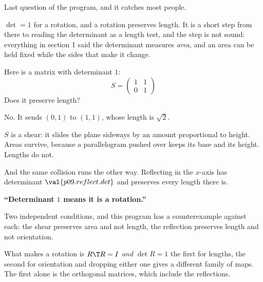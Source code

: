 \begin{fr}
Last question of the program, and it catches most people.

$\det = 1$ for a rotation, and a rotation preserves length. It is a short step
from there to reading the determinant as a length test, and the step is not
sound: everything in section 1 said the determinant measures \emph{area}, and
an area can be held fixed while the sides that make it change.

Here is a matrix with determinant $1$:
\[ S = \begin{pmatrix} 1 & 1 \\ 0 & 1 \end{pmatrix} \]
Does it preserve length?
\dotline
\nextframe
\end{fr}

\begin{fr}
\begin{ansblock}
No. It sends $(0,1)$ to $(1,1)$, whose length is $\sqrt{2}$.
\end{ansblock}

$S$ is a shear: it slides the plane sideways by an amount proportional to
height. Areas survive, because a parallelogram pushed over keeps its base and
its height. Lengths do not.

And the same collision runs the other way. Reflecting in the $x$-axis has
determinant $\val{p09.reflect.det}$ and preserves every length there is.
\end{fr}

\begin{trapbox}
\textbf{\enquote{Determinant $1$ means it is a rotation.}}

Two independent conditions, and this program has a counterexample against each:
the shear preserves area and not length, the reflection preserves length and
not orientation.

What makes a rotation is $R\T R = I$ \emph{and} $\det R = 1$ \dash{} the first
for lengths, the second for orientation \dash{} and dropping either one gives a
different family of maps. The first alone is the orthogonal matrices, which
include the reflections.
\end{trapbox}

